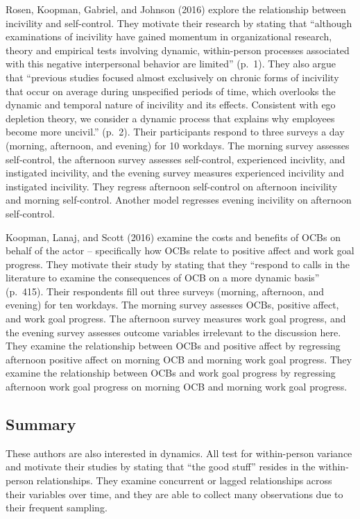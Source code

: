 \documentclass[english,,man]{apa6}
\theoremstyle{definition}
\theoremstyle{definition}
\theoremstyle{definition}
\theoremstyle{remark}
\begin{document}
Rosen, Koopman, Gabriel, and Johnson (2016) explore the relationship
between incivility and self-control. They motivate their research by
stating that \enquote{although examinations of incivility have gained
momentum in organizational research, theory and empirical tests
involving dynamic, within-person processes associated with this negative
interpersonal behavior are limited} (p.~1). They also argue that
\enquote{previous studies focused almost exclusively on chronic forms of
incivility that occur on average during unspecified periods of time,
which overlooks the dynamic and temporal nature of incivility and its
effects. Consistent with ego depletion theory, we consider a dynamic
process that explains why employees become more uncivil.} (p.~2). Their
participants respond to three surveys a day (morning, afternoon, and
evening) for 10 workdays. The morning survey assesses self-control, the
afternoon survey assesses self-control, experienced incivlity, and
instigated incivility, and the evening survey measures experienced
incivility and instigated incivility. They regress afternoon
self-control on afternoon incivility and morning self-control. Another
model regresses evening incivility on afternoon self-control.

Koopman, Lanaj, and Scott (2016) examine the costs and benefits of OCBs
on behalf of the actor -- specifically how OCBs relate to positive
affect and work goal progress. They motivate their study by stating that
they \enquote{respond to calls in the literature to examine the
consequences of OCB on a more dynamic basis} (p.~415). Their respondents
fill out three surveys (morning, afternoon, and evening) for ten
workdays. The morning survey assesses OCBs, positive affect, and work
goal progress. The afternoon survey measures work goal progress, and the
evening survey assesses outcome variables irrelevant to the discussion
here. They examine the relationship between OCBs and positive affect by
regressing afternoon positive affect on morning OCB and morning work
goal progress. They examine the relationship between OCBs and work goal
progress by regressing afternoon work goal progress on morning OCB and
morning work goal progress.

\hypertarget{summary-1}{%
\subsection{Summary}\label{summary-1}}

These authors are also interested in dynamics. All test for
within-person variance and motivate their studies by stating that
\enquote{the good stuff} resides in the within-person relationships.
They examine concurrent or lagged relationships across their variables
over time, and they are able to collect many observations due to their
frequent sampling.
\end{document}
